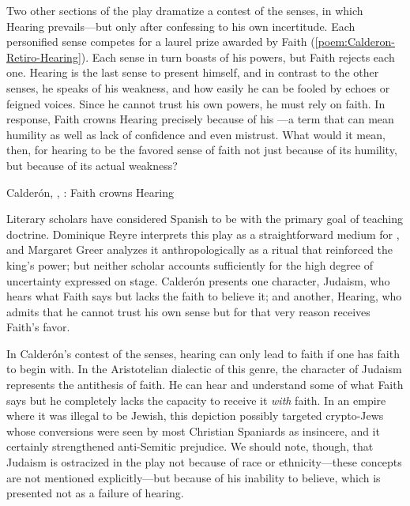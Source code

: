 Two other sections of the play dramatize a contest of the senses, in which
Hearing prevails---but only after confessing to his own incertitude.
Each personified sense competes for a laurel prize awarded by Faith
(\cref{poem:Calderon-Retiro-Hearing}).
Each sense in turn boasts of his powers, but Faith rejects each one.
Hearing is the last sense to present himself, and in contrast to the other
senses, he speaks of his weakness, and how easily he can be fooled by echoes or
feigned voices.
Since he cannot trust his own powers, he must rely on faith.
In response, Faith crowns Hearing precisely because of his
---a term that can mean humility as well as lack of
confidence and even mistrust.
What would it mean, then, for hearing to be the favored sense of faith not just
because of its humility, but because of its actual weakness?

{Calderón, , : Faith crowns
Hearing}

Literary scholars have considered Spanish  to be
 with the primary goal of teaching
doctrine.
Dominique Reyre interprets this play as a straightforward medium for
, and Margaret Greer analyzes it
anthropologically as a ritual that reinforced the king's power; but neither
scholar accounts sufficiently for the high degree of uncertainty expressed on
stage.%
    \Autocites{Reyre:Retiro}{Greer:Retiro}
Calderón presents one character, Judaism, who hears what Faith says but lacks
the faith to believe it; and another, Hearing, who admits that he cannot trust
his own sense but for that very reason receives Faith's favor.

In Calderón's contest of the senses, hearing can only lead to faith if one has
faith to begin with.
In the Aristotelian dialectic of this genre, the character of Judaism
represents the antithesis of faith. 
He can hear and understand some of what Faith says but he completely lacks the
capacity to receive it \emph{with} faith.
In an empire where it was illegal to be Jewish, this depiction possibly
targeted crypto-Jews whose conversions were seen by most Christian Spaniards as
insincere, and it certainly strengthened anti-Semitic prejudice.
We should note, though, that Judaism is ostracized in the play not because of
race or ethnicity---these concepts are not mentioned explicitly---but because
of his inability to believe, which is presented not as a failure of hearing.

